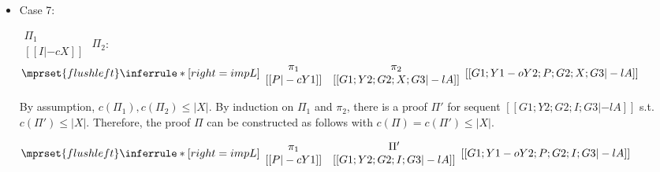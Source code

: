 \begin{itemize}
\item Case 7:
      \begin{center}
        \scriptsize
        \begin{math}
          \begin{array}{c}
            \Pi_1 \\
            {[[I |-c X]]}
          \end{array}
        \end{math}
        \qquad\qquad
        $\Pi_2$:
        \begin{math}
          $$\mprset{flushleft}
          \inferrule* [right={\tiny impL}] {
            {
              \begin{array}{cc}
                \pi_1 & \pi_2 \\
                {[[P |-c Y1]]} & {[[G1; Y2; G2; X; G3 |-l A]]}
              \end{array}
            }
          }{[[G1; Y1 -o Y2; P; G2; X; G3 |-l A]]}
        \end{math}
      \end{center}
      By assumption, $c(\Pi_1),c(\Pi_2)\leq |X|$. By induction on $\Pi_1$
      and $\pi_2$, there is a proof $\Pi'$ for sequent
      $[[G1; Y2; G2; I; G3 |-l A]]$ s.t. $c(\Pi') \leq |X|$. Therefore, the
      proof $\Pi$ can be constructed as follows with
      $c(\Pi) = c(\Pi') \leq |X|$.
      \begin{center}
        \scriptsize
        \begin{math}
          $$\mprset{flushleft}
          \inferrule* [right={\tiny impL}] {
            {
              \begin{array}{cc}
                \pi_1 & \Pi' \\
                {[[P |-c Y1]]} & {[[G1; Y2; G2; I; G3 |-l A]]}
              \end{array}
            }
          }{[[G1; Y1 -o Y2; P; G2; I; G3 |-l A]]}
        \end{math}
      \end{center}


\end{itemize}
